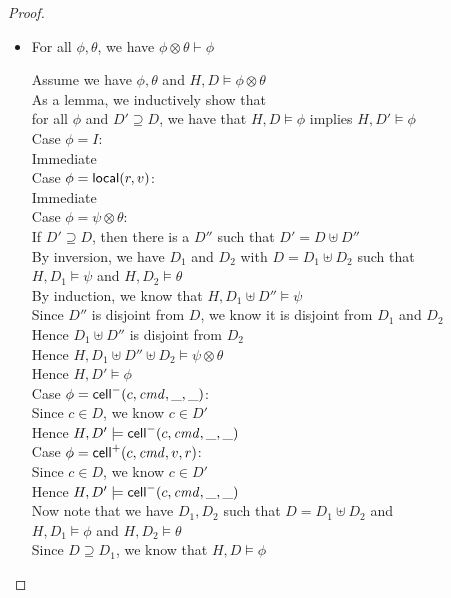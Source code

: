 \begin{proof}
\begin{itemize}
\item For all $\phi, \theta$, we have $\phi \otimes \theta \vdash \phi$
\begin{tabbedproof}
\oo Assume we have $\phi, \theta$ and $H, D \models \phi \otimes \theta$ \\
\oo As a lemma, we inductively show that \\
\ox for all $\phi$ and $D' \supseteq D$, we have that $H, D \models \phi$ implies $H, D' \models \phi$ \\
\ooo Case $\phi = I$: \\
\oooo Immediate \\
\ooo Case $\phi = \mathsf{local}({r}, {v})$: \\
\oooo Immediate\\
\ooo Case $\phi = \psi \otimes \theta$: \\
\oooo If $D' \supseteq D$, then there is a $D''$ such that $D' = D \uplus D''$ \\
\oooo By inversion, we have $D_1$ and $D_2$ with $D = D_1 \uplus D_2$ such that \\
\ooox $H, D_1 \models \psi$ and $H, D_2 \models \theta$ \\
\oooo By induction, we know that $H, D_1 \uplus D'' \models \psi$ \\
\oooo Since $D''$ is disjoint from $D$, we know it is disjoint from $D_1$ and $D_2$ \\
\oooo Hence $D_1 \uplus D''$ is disjoint from $D_2$ \\
\oooo Hence $H, D_1 \uplus D'' \uplus D_2 \models \psi \otimes \theta$ \\
\oooo Hence $H, D' \models \phi$ \\
\ooo Case $\phi = \mathsf{cell}^{-}({c}, {\mathit{cmd}}, {\_}, {\_})$: \\
\oooo Since $c \in D$, we know $c \in D'$ \\
\oooo Hence $H, D' \models \mathsf{cell}^{-}({c}, {\mathit{cmd}}, {\_}, {\_})$ \\
\ooo Case $\phi = \mathsf{cell}^{+}({c}, {\mathit{cmd}}, {v}, {r})$: \\
\oooo Since $c \in D$, we know $c \in D'$ \\
\oooo Hence $H, D' \models \mathsf{cell}^{-}({c}, {\mathit{cmd}}, {\_}, {\_})$ \\
\oo Now note that we have $D_1, D_2$ such that $D = D_1 \uplus D_2$ and \\
\ox $H, D_1 \models \phi$ and $H, D_2 \models \theta$ \\
\oo Since $D \supseteq D_1$, we know that $H, D \models \phi$ \\
\end{tabbedproof}


\end{itemize}
\end{proof}
